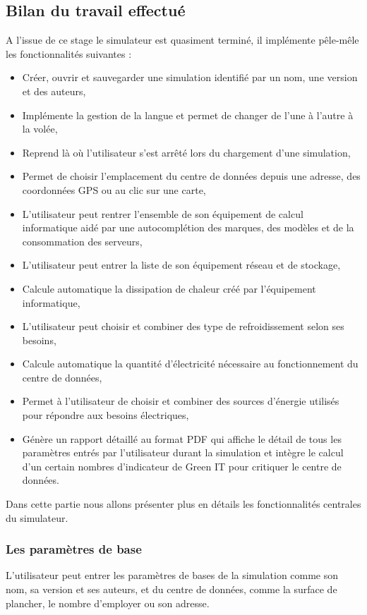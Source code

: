 \subsection{Bilan du travail effectué}
A l'issue de ce stage le simulateur est quasiment terminé, il implémente pêle-mêle les fonctionnalités suivantes :
\begin{itemize}
	\item Créer, ouvrir et sauvegarder une simulation identifié par un nom, une version et des auteurs,
	\item Implémente la gestion de la langue et permet de changer de l'une à l'autre à la volée,
	\item Reprend là où l'utilisateur s'est arrêté lors du chargement d'une simulation,
	\item Permet de choisir l'emplacement du centre de données depuis une adresse, des coordonnées GPS ou au clic sur une carte,
	\item L'utilisateur peut rentrer l'ensemble de son équipement de calcul informatique aidé par une autocomplétion des marques, des modèles et de la consommation des serveurs,
	\item L'utilisateur peut entrer la liste de son équipement réseau et de stockage,
	\item Calcule automatique la dissipation de chaleur créé par l'équipement informatique,
	\item L'utilisateur peut choisir et combiner des type de refroidissement selon ses besoins,
	\item Calcule automatique la quantité d'électricité nécessaire au fonctionnement du centre de données,
	\item Permet à l'utilisateur de choisir et combiner des sources d'énergie utilisés pour répondre aux besoins électriques,
	\item Génère un rapport détaillé au format PDF qui affiche le détail de tous les paramètres entrés par l'utilisateur durant la simulation et intègre le calcul d'un certain nombres d'indicateur de Green IT pour critiquer le centre de données.\\
\end{itemize}
Dans cette partie nous allons présenter plus en détails les fonctionnalités centrales du simulateur.

\subsubsection{Les paramètres de base}
L'utilisateur peut entrer les paramètres de bases de la simulation comme son nom, sa version et ses auteurs, et du centre de données, comme la surface de plancher, le nombre d'employer ou son adresse.

